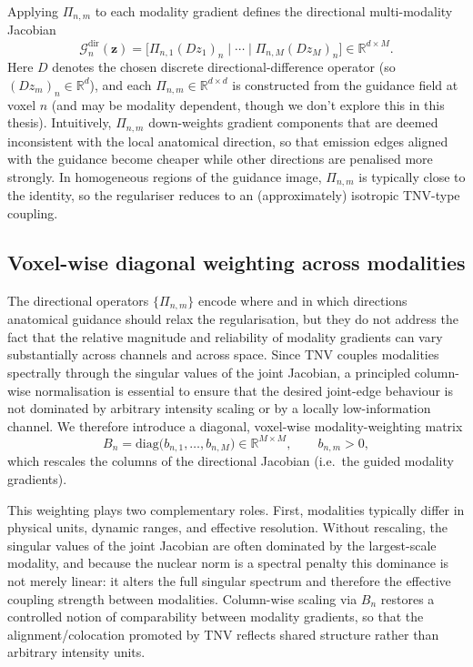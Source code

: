 Applying $\Pi_{n,m}$ to each modality gradient defines the directional multi-modality Jacobian
\begin{equation}
\mathcal{G}^{\mathrm{dir}}_n(\bm{z})= \bigl[\Pi_{n,1}(D z_1)_n \;|\; \cdots \;|\; \Pi_{n,M}(D z_M)_n\bigr]\in\mathbb{R}^{d\times M}.
\end{equation}
Here $D$ denotes the chosen discrete directional-difference operator (so $(D z_m)_n\in\mathbb{R}^d$), and each $\Pi_{n,m}\in\mathbb{R}^{d\times d}$ is constructed from the guidance field at voxel $n$ (and may be modality dependent, though we don't explore this in this thesis). Intuitively, $\Pi_{n,m}$ down-weights gradient components that are deemed inconsistent with the local anatomical direction, so that emission edges aligned with the guidance become cheaper while other directions are penalised more strongly. In homogeneous regions of the guidance image, $\Pi_{n,m}$ is typically close to the identity, so the regulariser reduces to an (approximately) isotropic TNV-type coupling.

\subsection{Voxel-wise diagonal weighting across modalities}
\label{subsec:voxelwise_weighting}

The directional operators $\{\Pi_{n,m}\}$ encode where and in which directions anatomical guidance should relax the regularisation, but they do not address the fact that the relative magnitude and reliability of modality gradients can vary substantially across channels and across space. Since TNV couples modalities spectrally through the singular values of the joint Jacobian, a principled column-wise normalisation is essential to ensure that the desired joint-edge behaviour is not dominated by arbitrary intensity scaling or by a locally low-information channel. We therefore introduce a diagonal, voxel-wise modality-weighting matrix
\begin{equation}
B_n = \mathrm{diag}\bigl(b_{n,1},\ldots,b_{n,M}\bigr)\in\mathbb{R}^{M\times M},
\qquad
b_{n,m}>0,
\end{equation}
which rescales the columns of the directional Jacobian (i.e.\ the guided modality gradients).

This weighting plays two complementary roles. First, modalities typically differ in physical units, dynamic ranges, and effective resolution. Without rescaling, the singular values of the joint Jacobian are often dominated by the largest-scale modality, and because the nuclear norm is a spectral penalty this dominance is not merely linear: it alters the full singular spectrum and therefore the effective coupling strength between modalities. Column-wise scaling via $B_n$ restores a controlled notion of comparability between modality gradients, so that the alignment/colocation promoted by TNV reflects shared structure rather than arbitrary intensity units.

